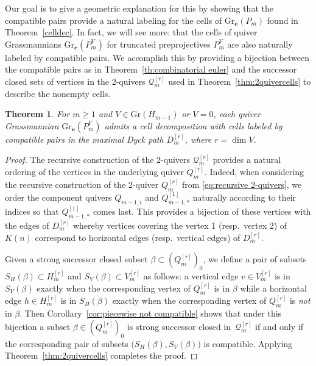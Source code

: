 \documentclass{amsart}
\newcommand{\sayD}[1]{\say[D]{#1}}
\newtheorem{theorem}{Theorem}[section]
\numberwithin{equation}{section}
\newcommand{\bfe}{\mathbf{e}}
\newcommand{\cQ}{\mathcal{Q}}
\newcommand{\Gr}{\mathrm{Gr}}
\begin{document}
Our goal is to give a geometric explanation for this by showing that the compatible pairs provide a natural labeling for the cells of $\Gr_\bfe(P_m)$ found in Theorem~\ref{celldec}.
In fact, we will see more: that the cells of quiver Grassmannians $\Gr_\bfe(P_m^V)$ for truncated preprojectives $P_m^V$ are also naturally labeled by compatible pairs.
We accomplish this by providing a bijection between the compatible pairs as in Theorem~\ref{th:combinatorial euler} and the successor closed sets of vertices in the 2-quivers $\cQ_m^{[r]}$ used in Theorem~\ref{thm:2quivercells} to describe the nonempty cells.
\begin{theorem}
  \label{th:compatible cells}
  \sayD{Fix abuse of notation $H_m$.}
  For $m\ge1$ and $V\in\Gr(H_{m-1})$ or $V=0$, each quiver Grassmannian $\Gr_\bfe(P_m^V)$ admits a cell decomposition with cells labeled by compatible pairs in the maximal Dyck path $D_m^{[r]}$, where $r=\dim V$.
\end{theorem}
\begin{proof}
  The recursive construction of the 2-quivers $\cQ_m^{[r]}$ provides a natural ordering of the vertices in the underlying quiver $Q_m^{[r]}$.
  Indeed, when considering the recursive construction of the 2-quiver $Q_m^{[r]}$ from \eqref{eq:recursive 2-quivers}, we order the component quivers $Q_{m-1,i}$ and $Q_{m-1,*}^{[1]}$ naturally according to their indices so that $Q_{m-1,*}^{[1]}$ comes last.
  This provides a bijection of these vertices with the edges of $D_m^{[r]}$ whereby vertices covering the vertex 1 (resp.\ vertex 2) of $K(n)$ correspond to horizontal edges (resp.\ vertical edges) of $D_m^{[r]}$.

  Given a strong successor closed subset $\beta\subset(Q_m^{[r]})_0$, we define a pair of subsets $S_H(\beta)\subset H_m^{[r]}$ and $S_V(\beta)\subset V_m^{[r]}$ as follows: a vertical edge $v\in V_m^{[r]}$ is in $S_V(\beta)$ exactly when the corresponding vertex of $Q_m^{[r]}$ is in $\beta$ while a horizontal edge $h\in H_m^{[r]}$ is in $S_H(\beta)$ exactly when the corresponding vertex of $Q_m^{[r]}$ is \emph{not} in $\beta$.
  Then Corollary~\ref{cor:piecewise not compatible} shows that under this bijection a subset $\beta\in(Q_m^{[r]})_0$ is strong successor closed in~$\cQ_m^{[r]}$ if and only if the corresponding pair of subsets $\big(S_H(\beta),S_V(\beta)\big)$ is compatible.
  Applying Theorem~\ref{thm:2quivercells} completes the proof.
\end{proof}
\end{document}
